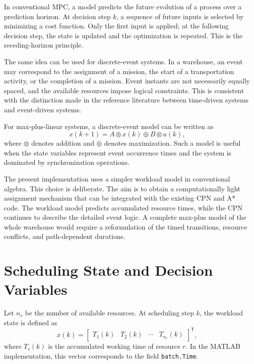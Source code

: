 In conventional MPC, a model predicts the future evolution of a process over
a prediction horizon. At decision step $k$, a sequence of future inputs is
selected by minimizing a cost function. Only the first input is applied; at
the following decision step, the state is updated and the optimization is
repeated. This is the receding-horizon principle.

The same idea can be used for discrete-event systems. In a warehouse, an
event may correspond to the assignment of a mission, the start of a
transportation activity, or the completion of a mission. Event instants are
not necessarily equally spaced, and the available resources impose logical
constraints. This is consistent with the distinction made in the reference
literature between time-driven systems and event-driven systems.

For max-plus-linear systems, a discrete-event model can be written as
\begin{equation}
	x(k+1) = A \otimes x(k) \oplus B \otimes u(k),
\end{equation}
where $\otimes$ denotes addition and $\oplus$ denotes maximization. Such a
model is useful when the state variables represent event occurrence times
and the system is dominated by synchronization operations.

The present implementation uses a simpler workload model in conventional
algebra. This choice is deliberate. The aim is to obtain a computationally
light assignment mechanism that can be integrated with the existing CPN and
A* code. The workload model predicts accumulated resource times, while the
CPN continues to describe the detailed event logic. A complete max-plus
model of the whole warehouse would require a reformulation of the timed
transitions, resource conflicts, and path-dependent durations.

\section{Scheduling State and Decision Variables}

Let $n_r$ be the number of available resources. At scheduling step $k$, the
workload state is defined as
\begin{equation}
	x(k) =
	\begin{bmatrix}
		T_1(k) & T_2(k) & \cdots & T_{n_r}(k)
	\end{bmatrix}^{\mathsf{T}},
\end{equation}
where $T_r(k)$ is the accumulated working time of resource $r$. In the
MATLAB implementation, this vector corresponds to the field
\texttt{batch.Time}.

